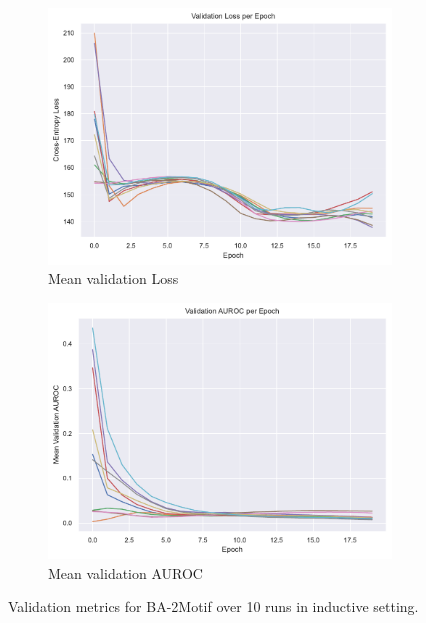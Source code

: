 \begin{figure}[htbp]
    \centering
    \begin{subfigure}[b]{0.48\textwidth}
        \centering
        \includegraphics[width=\textwidth]{img/plots/2M_val_loss_plot_NO_LEGEND.pdf}
        \caption{Mean validation Loss}
        \label{fig:BA-2Motif-val_loss}
    \end{subfigure}
    \hfill
    \begin{subfigure}[b]{0.48\textwidth}
        \centering
        \includegraphics[width=\textwidth]{img/plots/2M_val_auroc_plot_NO_LEGEND.pdf}
        \caption{Mean validation AUROC}
        \label{fig:BA-2Motif-val_auroc}
    \end{subfigure}
    \caption[Validation metrics for BA-2Motif]{Validation metrics for BA-2Motif over 10 runs in inductive setting.}
    \label{fig:BA-2Motif-val_metrics}
\end{figure}
\newpage
